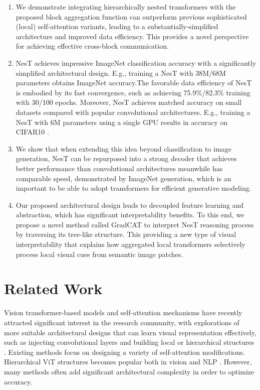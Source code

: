 \documentclass{article}
\newcommand{\OURS}{NesT\xspace}
\begin{document}
\begin{enumerate}[leftmargin=7.5mm]
    \setlength\itemsep{0.3em}
    \item We demonstrate integrating hierarchically nested transformers with the proposed block aggregation function can outperform previous sophisticated (local) self-attention variants, leading to a substantially-simplified architecture and improved data efficiency. This provides a novel perspective for achieving effective cross-block communication.
    \item \OURS achieves impressive ImageNet classification accuracy with a significantly simplified architectural design. 
    E.g., training a \OURS with 38M/68M parameters obtains  ImageNet accuracy.The favorable data efficiency of \OURS is embodied by its fast convergence, such as achieving 75.9\%/82.3\% training with 30/100 epochs. Moreover, \OURS achieves matched accuracy on small datasets compared with popular convolutional architectures. E.g., training a \OURS with 6M parameters using a single GPU results in  accuracy on CIFAR10 . 
    \item We show that when extending this idea beyond classification to image generation, \OURS can be repurposed into a strong decoder that achieves better performance than convolutional architectures meanwhile has comparable speed, demonstrated by  ImageNet generation, which is an important to be able to adopt transformers for efficient generative modeling.
    \item Our proposed architectural design leads to decoupled feature learning and abstraction, which has significant interpretability benefits. To this end, we propose a novel method called GradCAT to interpret \OURS reasoning process by traversing its tree-like structure. This providing a new type of visual interpretability that explains how aggregated local transformers selectively process local visual cues from semantic image patches.
\end{enumerate}


\section{Related Work}
\label{sec:relatedwork}
Vision transformer-based models \cite{cordonnier2019relationship,dosovitskiy2020image} and self-attention mechanisms \cite{vaswani2021scaling,ramachandran2019stand} have recently attracted significant interest in the research community, with explorations of more suitable architectural designs that can learn visual representation effectively, such as injecting convolutional layers \cite{li2021localvit,srinivas2021bottleneck,yuan2021tokens} and building local or hierarchical structures \cite{zhang2021multi,wang2021pyramid}. 
Existing methods focus on designing a variety of self-attention modifications. Hierarchical ViT structures becomes popular both in vision \cite{liu2021swin,vaswani2021scaling} and NLP \cite{zhang2019hibert,santra2020hierarchical,liu2019hierarchical,pappagari2019hierarchical}. However, many methods  often add significant architectural complexity in order to optimize  accuracy. 
\end{document}
